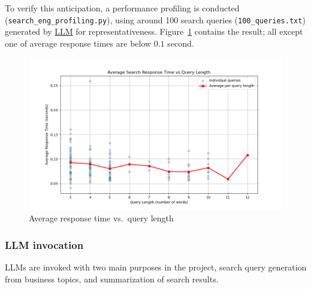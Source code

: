 \documentclass[final-report]{report-template}
\newcommand\ttb{\discretionary{}{}{}}
\begin{document}
To verify this anticipation, a performance profiling is conducted
(\texttt{search\_\ttb eng\_\ttb profiling.py}), using around 100
search queries (\texttt{100\_\ttb queries.txt}) generated by
\href{https://chatgpt.com/share/689a013a-5964-8011-af0d-68a169ce8290}{LLM} for
representativeness. Figure~\ref{fig.response.time} contains the result; all
except one of average response times are below $0.1$ second.
\begin{figure}[hbtp!]
	\centering
	\includegraphics[height=.25\textheight]{res/avg_time_vs_query_length.png}
	\caption{Average response time vs.\ query length}
	\label{fig.response.time}
\end{figure}

\subsubsection{LLM invocation}
LLMs are invoked with two main purposes in the project, search query generation
from business topics, and summarization of search results.
\end{document}
